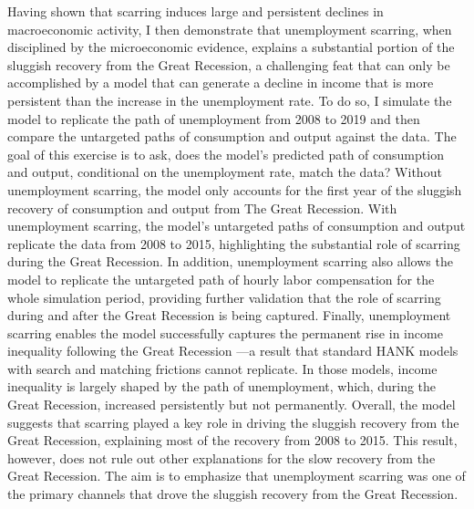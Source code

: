  Having shown that scarring induces large and persistent declines in macroeconomic activity, I then demonstrate that unemployment scarring, when disciplined by the microeconomic evidence, explains a substantial portion of the sluggish recovery from the Great Recession, a challenging feat that can only be accomplished by a model that can generate a decline in income that is more persistent than the increase in the unemployment rate. To do so, I simulate the model to replicate the path of unemployment from 2008 to 2019 and then compare the untargeted paths of consumption and output against the data. The goal of this exercise is to ask, does the model's predicted path of consumption and output, conditional on the unemployment rate, match the data? Without unemployment scarring, the model only accounts for the first year of the sluggish recovery of consumption and output from The Great Recession. With unemployment scarring, the model's untargeted paths of consumption and output replicate the data from 2008 to 2015, highlighting the substantial role of scarring during the Great Recession. In addition, unemployment scarring also allows the model to replicate the untargeted path of hourly labor compensation for the whole simulation period, providing further validation that the role of scarring during and after the Great Recession is being captured. Finally, unemployment scarring enables the model successfully captures the permanent rise in income inequality following the Great Recession ---a result that standard HANK models with search and matching frictions cannot replicate. In those models, income inequality is largely shaped by the path of unemployment, which, during the Great Recession, increased persistently but not permanently. Overall, the model suggests that scarring played a key role in driving the sluggish recovery from the Great Recession, explaining most of the recovery from 2008 to 2015. This result, however, does not rule out other explanations for the slow recovery from the Great Recession. The aim is to emphasize that unemployment scarring was one of the primary channels that drove the sluggish recovery from the Great Recession.

